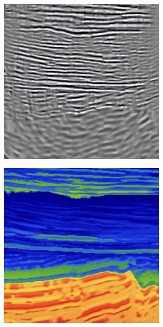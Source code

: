 \documentclass[
]{article}
\begin{document}
\begin{figure}

\begin{minipage}{0.50\linewidth}

\begin{figure}[H]

{\centering \includegraphics[width=0.9\textwidth,height=\textheight]{./figs/rtm483.png}

}


\end{figure}%

\end{minipage}%
%
\begin{minipage}{0.50\linewidth}

\begin{figure}[H]

{\centering \includegraphics[width=0.9\textwidth,height=\textheight]{./figs/483_velo_rainbow.png}

}
\end{figure}
\end{minipage}
\end{figure}
\end{document}
